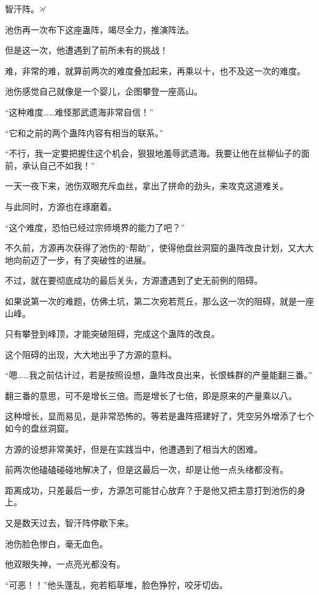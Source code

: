 
\begin{this_body}

智汗阵。≯

池伤再一次布下这座蛊阵，竭尽全力，推演阵法。

但是这一次，他遭遇到了前所未有的挑战！

难，非常的难，就算前两次的难度叠加起来，再乘以十，也不及这一次的难度。

池伤感觉自己就像是一个婴儿，企图攀登一座高山。

“这种难度……难怪那武遗海非常自信！”

“它和之前的两个蛊阵内容有相当的联系。”

“不行，我一定要把握住这个机会，狠狠地羞辱武遗海。我要让他在丝柳仙子的面前，承认自己不如我！”

一天一夜下来，池伤双眼充斥血丝，拿出了拼命的劲头，来攻克这道难关。

与此同时，方源也在琢磨着。

“这个难度，恐怕已经过宗师境界的能力了吧？”

不久前，方源再次获得了池伤的“帮助”，使得他盘丝洞窟的蛊阵改良计划，又大大地向前迈了一步，有了突破性的进展。

不过，就在要彻底成功的最后关头，方源遭遇到了史无前例的阻碍。

如果说第一次的难题，仿佛土坑，第二次宛若荒丘，那么这一次的阻碍，就是一座山峰。

只有攀登到峰顶，才能突破阻碍，完成这个蛊阵的改良。

这个阻碍的出现，大大地出乎了方源的意料。

“嗯……我之前估计过，若是按照设想，蛊阵改良出来，长恨蛛群的产量能翻三番。”

翻三番的意思，可不是增长三倍。而是增长了七倍，即是原来的产量乘以八。

这种增长，显而易见，是非常恐怖的。等若是蛊阵搭建好了，凭空另外增添了七个如今的盘丝洞窟。

方源的设想非常美好，但是在实践当中，他遭遇到了相当大的困难。

前两次他磕磕碰碰地解决了，但是这最后一次，却是让他一点头绪都没有。

距离成功，只差最后一步，方源怎可能甘心放弃？于是他又把主意打到池伤的身上。

又是数天过去，智汗阵停歇下来。

池伤脸色惨白，毫无血色。

他双眼失神，一点亮光都没有。

“可恶！！”他头蓬乱，宛若稻草堆，脸色狰狞，咬牙切齿。


\end{this_body}
